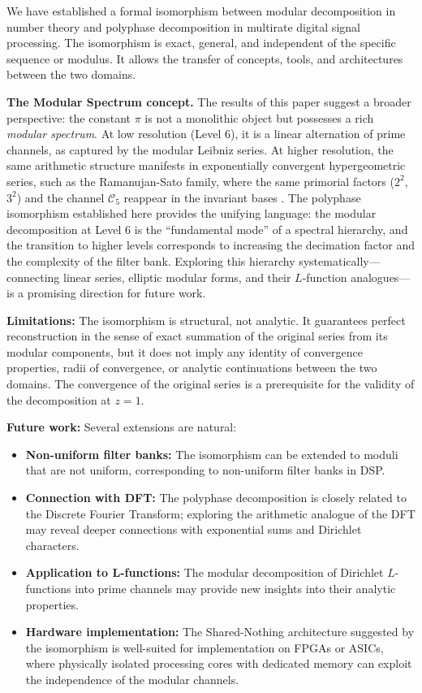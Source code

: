 \documentclass[12pt,a4paper]{article}
\theoremstyle{plain}
\theoremstyle{definition}
\theoremstyle{remark}
\begin{document}
We have established a formal isomorphism between modular decomposition in number theory and polyphase decomposition in multirate digital signal processing. The isomorphism is exact, general, and independent of the specific sequence or modulus. It allows the transfer of concepts, tools, and architectures between the two domains.

\textbf{The Modular Spectrum concept.} The results of this paper suggest a broader perspective: the constant $\pi$ is not a monolithic object but possesses a rich \emph{modular spectrum}. At low resolution (Level 6), it is a linear alternation of prime channels, as captured by the modular Leibniz series. At higher resolution, the same arithmetic structure manifests in exponentially convergent hypergeometric series, such as the Ramanujan-Sato family, where the same primorial factors ($2^2$, $3^2$) and the channel $\mathcal{C}_5$ reappear in the invariant bases \cite{chudnovsky}. The polyphase isomorphism established here provides the unifying language: the modular decomposition at Level 6 is the ``fundamental mode'' of a spectral hierarchy, and the transition to higher levels corresponds to increasing the decimation factor and the complexity of the filter bank. Exploring this hierarchy systematically---connecting linear series, elliptic modular forms, and their $L$-function analogues---is a promising direction for future work.

\textbf{Limitations:} The isomorphism is structural, not analytic. It guarantees perfect reconstruction in the sense of exact summation of the original series from its modular components, but it does not imply any identity of convergence properties, radii of convergence, or analytic continuations between the two domains. The convergence of the original series is a prerequisite for the validity of the decomposition at \(z=1\).

\textbf{Future work:} Several extensions are natural:
\begin{itemize}
    \item \textbf{Non-uniform filter banks:} The isomorphism can be extended to moduli that are not uniform, corresponding to non-uniform filter banks in DSP.
    \item \textbf{Connection with DFT:} The polyphase decomposition is closely related to the Discrete Fourier Transform; exploring the arithmetic analogue of the DFT may reveal deeper connections with exponential sums and Dirichlet characters.
    \item \textbf{Application to L-functions:} The modular decomposition of Dirichlet \(L\)-functions into prime channels may provide new insights into their analytic properties.
    \item \textbf{Hardware implementation:} The Shared-Nothing architecture suggested by the isomorphism is well-suited for implementation on FPGAs or ASICs, where physically isolated processing cores with dedicated memory can exploit the independence of the modular channels.
\end{itemize}
\end{document}
